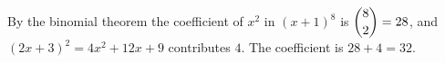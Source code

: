 By the binomial theorem the coefficient of $x^2$ in $(x+1)^8$ is $\dbinom82=28$, and $(2x+3)^2=4x^2+12x+9$ contributes $4$. The coefficient is $28+4=\boxed{32}$.
